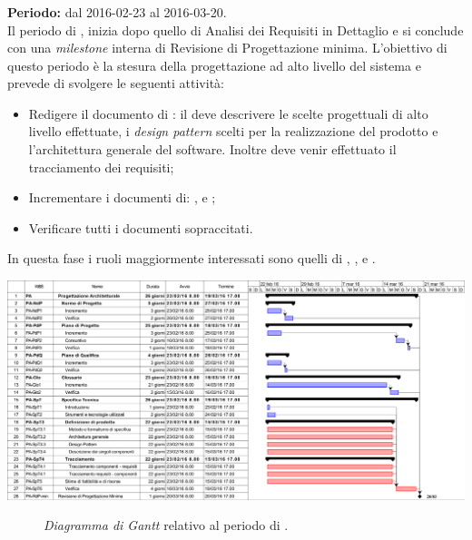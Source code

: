 \subsubsection{\PA}
\textbf{Periodo:} dal 2016-02-23 al 2016-03-20. \\
Il periodo di \PA, inizia dopo quello di Analisi dei Requisiti in Dettaglio e si conclude con una \textit{milestone} interna di Revisione di Progettazione minima. L'obiettivo di questo periodo è la stesura della progettazione ad alto livello del sistema e prevede di svolgere le seguenti attività:
\begin{itemize}
	\item Redigere il documento di \textit{\ST}: il \textit{\Prog} deve descrivere le scelte progettuali di alto livello effettuate, i \textit{design pattern} scelti per la realizzazione del prodotto e l'architettura generale del software. Inoltre deve venir effettuato il tracciamento dei requisiti;  
	\item Incrementare i documenti di: \textit{\NdP}, \textit{\PdP} e \textit{\PdQ};
	\item Verificare tutti i documenti sopraccitati.
\end{itemize}
In questa fase i ruoli maggiormente interessati sono quelli di \textit{\Amm}, \textit{\Res}, \textit{\Prog} e \textit{\Ver}. 
\begin{center}
	\includegraphics[keepaspectratio = true, width=16cm]{immagini/PdP_ProgettazioneArchitetturaleGantt.png}
\end{center}
\begin{figure}[h]
	\caption{\textit{Diagramma di Gantt} relativo al periodo di \PA.}\label{etichetta}
\end{figure}

